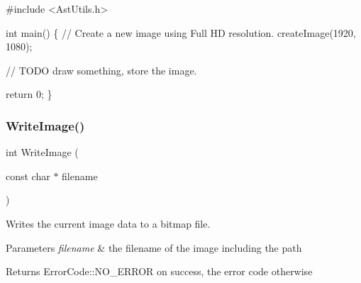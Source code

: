 \begin{DoxyCode}
\textcolor{preprocessor}{#include <AstUtils.h>}

\textcolor{keywordtype}{int} main()
\{
  \textcolor{comment}{// Create a new image using Full HD resolution.}
  createImage(1920, 1080);

  \textcolor{comment}{// TODO draw something, store the image.}

  \textcolor{keywordflow}{return} 0;
\}
\end{DoxyCode}
 \mbox{\label{group__graphics__group_ga7a92adcfb955193d1a9e91891cd390e0}} 
\subsubsection{\texorpdfstring{Write\+Image()}{WriteImage()}}
{\footnotesize\ttfamily int Write\+Image (\begin{DoxyParamCaption}\item[{const char $\ast$}]{filename }\end{DoxyParamCaption})}

Writes the current image data to a bitmap file.


\begin{DoxyParams}{Parameters}
{\em filename} & the filename of the image including the path \\
\hline
\end{DoxyParams}
\begin{DoxyReturn}{Returns}
Error\+Code\+::\+N\+O\+\_\+\+E\+R\+R\+OR on success, the error code otherwise 
\end{DoxyReturn}
